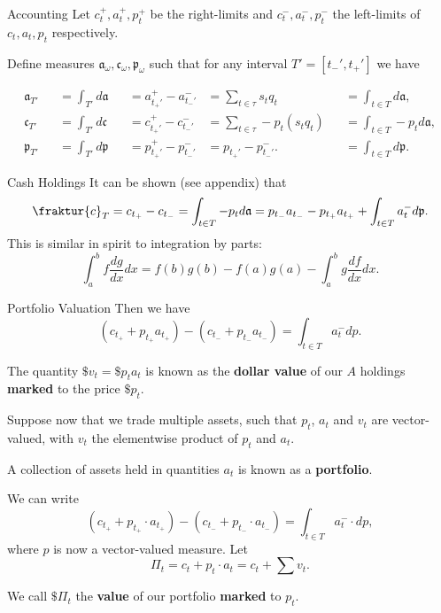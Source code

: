 \documentclass{beamer}
\begin{document}
\begin{frame}{Accounting}
	Let $c_t^+, a_t^+, p_t^+$ be the right-limits and $c_t^-, a_t^-, p_t^-$ the left-limits of $c_t,a_t, p_t$ respectively.

	\pause

	Define measures $\mathfrak{a}_\omega, \mathfrak{c}_\omega, \mathfrak{p}_\omega$ such that for any interval $T'=[t_-',t_+']$ we have

	\vspace{-0.06\textheight}
	\begin{align*}
		\mathfrak{a}_{T'} &&= \int_{T'} d\mathfrak{a} &&= a_{t_+'}^+ - a_{t_-'}^-	&= \sum_{t\in \tau} s_t q_t		&&= \int_{t\in T} d\mathfrak{a},
	\\	\mathfrak{c}_{T'} &&= \int_{T'} d\mathfrak{c} &&= c_{t_+'}^+ - c_{t_-'}^-	&= \sum_{t\in \tau} - p_t (s_t q_t)	&&= \int_{t\in T} - p_t d\mathfrak{a},
	\\	\mathfrak{p}_{T'} &&= \int_{T'} d\mathfrak{p} &&= p_{t_+'}^+ - p_{t_-'}^- 	&= p_{t_+'} - p_{t_-'}^-.		&&= \int_{t\in T} d\mathfrak{p}.
	\end{align*}%
\end{frame}

\begin{frame}{Cash Holdings}
	It can be shown (see appendix) that
	$$\fraktur{c}_T = c_{t_+} - c_{t_-} = \int_{t\in T} - p_t d\mathfrak{a} = p_{t_-}a_{t_-} - p_{t_+}a_{t_+} + \int_{t\in T} a_t^- d\mathfrak{p}.$$
	This is similar in spirit to integration by parts:
	$$\int_a^b f \frac{dg}{dx} dx = f(b)g(b)-f(a)g(a) - \int_a^b g \frac{df}{dx} dx.$$
\end{frame}

\begin{frame}{Portfolio Valuation}
	Then we have
	$$(c_{t_+} + p_{t_+}a_{t_+}) - (c_{t_-} + p_{t_-}a_{t_-}) = \int_{t\in T} a_t^- dp.$$

	The quantity $\$v_t = \$p_t a_t$ is known as the \textbf{dollar value} of our $A$ holdings \textbf{marked} to the price $\$p_t$.%

	\pause

	Suppose now that we trade multiple assets, such that $p_t$, $a_t$ and $v_t$ are vector-valued, with $v_t$ the elementwise product of $p_t$ and $a_t$.

	A collection of assets held in quantities $a_t$ is known as a \textbf{portfolio}.

	We can write
	$$(c_{t_+} + p_{t_+} \cdot a_{t_+}) - (c_{t_-} + p_{t_-} \cdot a_{t_-}) = \int_{t\in T} a_t^- \cdot dp,$$
	where $p$ is now a vector-valued measure. \pause Let
	$$\Pi_t	= c_t + p_t\cdot a_t = c_t + \sum v_t.$$

	We call $\$\Pi_t$ the \textbf{value} of our portfolio \textbf{marked} to $p_t$.
\end{frame}
\end{document}
